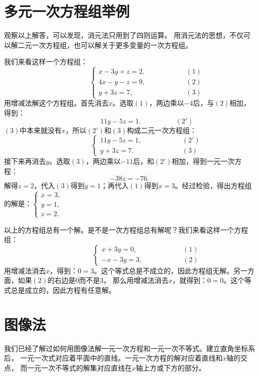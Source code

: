 \documentclass[12pt,UTF8,fontset=none]{ctexbook}
\begin{document}
\section{多元一次方程组举例}
观察以上解答，可以发现，消元法只用到了四则运算。
用消元法的思想，不仅可以解二元一次方程组，也可以解关于更多变量的一次方程组。

我们来看这样一个方程组：
$$ \quad \quad \quad \quad \quad\left\{
\begin{array}{cr}
     x - 3y + z = 2, & \quad \quad \quad \quad \quad (1) \\
     4x - y - z = 9, & \quad \quad \quad \quad \quad (2) \\
     y + 3z = 7, & \quad \quad \quad \quad \quad (3)
\end{array}\right.
$$
用增减法解这个方程组。首先消去$x$。选取$(1)$，两边乘以$-4$后，与$(2)$相加，得到：
$$ \quad\quad\quad\quad\quad 11y -5z = 1.\quad\quad\quad\quad\quad (2')$$
$(3)$中本来就没有$x$，所以$(2')$和$(3)$构成二元一次方程组：
$$ \quad \quad \quad \quad \quad\left\{
\begin{array}{cr}
    11y -5z = 1, & \quad \quad \quad \quad \quad (2') \\
    y + 3z = 7. & \quad \quad \quad \quad \quad (3) 
\end{array}\right.
$$
接下来再消去$y$。选取$(3)$，两边乘以$-11$后，和$(2')$相加，得到一元一次方程：
$$ -38z = -76.$$
解得$z = 2$，代入$(3)$得到$y = 1$；再代入$(1)$得到$x = 3$。经过检验，得出方程组的解是：$\left\{ \begin{array}{c}
    x = 3, \\
    y = 1, \\
    z = 2.
\end{array}\right.$

以上的方程组总有一个解。是不是一次方程组总有解呢？我们来看这样一个方程组：
$$ \quad \quad \quad \quad \quad\left\{
\begin{array}{cr}
     x + 3y = 0, & \quad \quad \quad \quad \quad (1) \\
     -x - 3y = 3, & \quad \quad \quad \quad \quad (2)
\end{array}\right.
$$
用增减法消去$x$，得到：$0 = 3$。这个等式总是不成立的，因此方程组无解。另一方面，如果$(2)$的右边是$0$而不是$3$，
那么用增减法消去$x$，就得到：$0 = 0$。这个等式总是成立的，因此方程有任意解。

\section{图像法}
我们已经了解过如何用图像法解一元一次方程和一元一次不等式。建立直角坐标系后，
一元一次式对应着平面中的直线。一元一次方程的解对应着直线和$x$轴的交点，
而一元一次不等式的解集对应直线在$x$轴上方或下方的部分。
\end{document}

